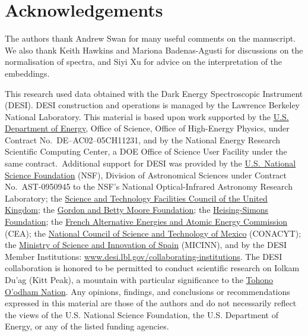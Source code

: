 \documentclass[fleqn,usenatbib]{mnras}
\begin{document}
\section*{Acknowledgements}

The authors thank Andrew Swan for many useful comments on the manuscript.
We also thank Keith Hawkins and Mariona Badenas-Agusti for discussions on the normalisation of spectra, and Siyi Xu for advice on the interpretation of the embeddings.

This research used data obtained with the Dark Energy Spectroscopic Instrument (DESI).
DESI construction and operations is managed by the Lawrence Berkeley National Laboratory.
This material is based upon work supported by the \href{https://www.energy.gov/}{U.S. Department of Energy}, Office of Science, Office of High-Energy Physics, under Contract No.\ DE--AC02--05CH11231, and by the National Energy Research Scientific Computing Center, a DOE Office of Science User Facility under the same contract.\
Additional support for DESI was provided by the \href{https://www.nsf.gov/}{U.S.\ National Science Foundation} (NSF), Division of Astronomical Sciences under Contract No.\ AST-0950945 to the NSF's National Optical-Infrared Astronomy Research Laboratory;
the \href{https://stfc.ukri.org/}{Science and Technology Facilities Council of the United Kingdom};
the \href{https://www.moore.org/}{Gordon and Betty Moore Foundation};
the \href{https://www.hsfoundation.org/}{Heising-Simons Foundation};
the \href{http://www.cea.fr/}{French Alternative Energies and Atomic Energy Commission} (CEA);
the \href{https://www.conacyt.gob.mx/}{National Council of Science and Technology of Mexico} (CONACYT);
the \href{http://www.mineco.gob.es/}{Ministry of Science and Innovation of Spain} (MICINN), and by the DESI Member Institutions: \url{www.desi.lbl.gov/collaborating-institutions}.
The DESI collaboration is honored to be permitted to conduct scientific research on Iolkam Du'ag (Kitt Peak), a mountain with particular significance to the \href{http://www.tonation-nsn.gov/}{Tohono O'odham Nation}.
Any opinions, findings, and conclusions or recommendations expressed in this material are those of the authors and do not necessarily reflect the views of the U.S. National Science Foundation, the U.S. Department of Energy, or any of the listed funding agencies.
\end{document}
